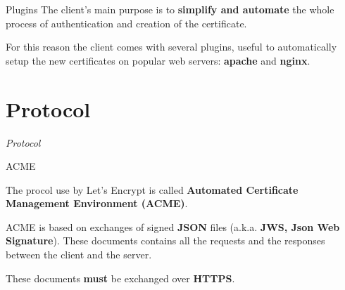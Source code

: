 \documentclass[xcolor=svgnames,11pt]{beamer}
\begin{document}
\begin{frame}{Plugins}
The client's main purpose is to \textbf{simplify and automate}
the whole process of authentication and creation of the certificate.

\medskip\pause

For this reason the client comes with several plugins, useful to automatically setup the new certificates on popular web servers:
\textbf{apache} and \textbf{nginx}.


\end{frame}

\section{Protocol}
\begin{frame}{}
\begin{center}
\begin{Huge}
\textcolor{leorange}{\emph{Protocol}}
\end{Huge}
\end{center}
\end{frame}


\begin{frame}{ACME}

\begin{block}{}
The procol use by Let's Encrypt is called \textbf{Automated Certificate Management Environment (ACME)}.
\end{block}

\medskip \pause
ACME is based on exchanges of signed \textbf{JSON} files (a.k.a. \textbf{JWS, Json Web Signature}).
These documents contains all the requests and the responses between the client and the server.

\medskip \pause
These documents \textbf{must} be exchanged over \textbf{HTTPS}.
\end{frame}
\end{document}
